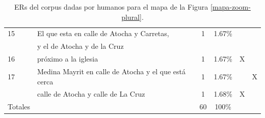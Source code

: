 \begin{table}[H]
{\begin{center}
\begin{tabular}{|l|l|c|c|c|c|}
15&El que esta en calle de Atocha y Carretas, 	      &	1	&	1.67\%	&&\\
&y el de Atocha y de la Cruz	      &		&	&&\\ \hline


16&pr\'oximo a la iglesia 	      &1		&	1.67\%	&X &\\ \hline

17&Medina Mayrit en calle de Atocha y el que est\'a cerca  				&  1 &	1.67\%	&&X\\ \hline
&calle de Atocha y calle de La Cruz  					&1  &	1.68\%	&X&\\ \hline 
\hline
Totales	&&60	&	100\%	&&\\

\hline
\end{tabular}
\caption{ERs del corpus dadas por humanos para el mapa de la Figura \ref{mapa-zoom-plural}.}\label{freq-mapa-zoom-plural}
\end{center}
}
\end{table}

